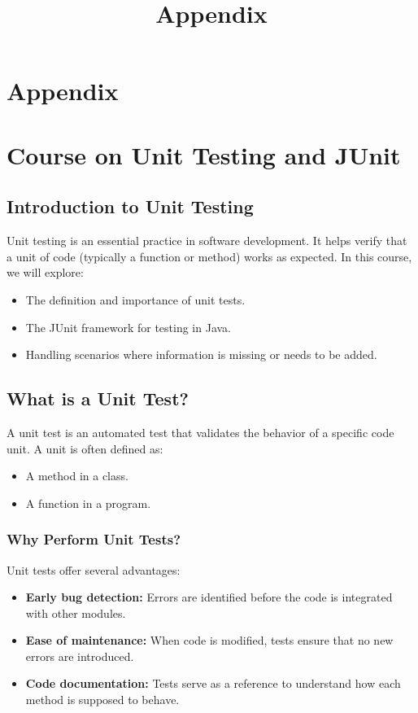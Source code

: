 \documentclass[12pt,a4paper]{article}
\title{Appendix}
\author{}
\date{}
\begin{document}
\maketitle

\tableofcontents

\newpage

\section*{Appendix}

\section{Course on Unit Testing and JUnit}
\subsection{Introduction to Unit Testing}
Unit testing is an essential practice in software development. It helps verify that a unit of code (typically a function or method) works as expected. In this course, we will explore:
\begin{itemize}
    \item The definition and importance of unit tests.
    \item The JUnit framework for testing in Java.
    \item Handling scenarios where information is missing or needs to be added.
\end{itemize}

\subsection{What is a Unit Test?}
A unit test is an automated test that validates the behavior of a specific code unit. A unit is often defined as:
\begin{itemize}
    \item A method in a class.
    \item A function in a program.
\end{itemize}

\subsubsection{Why Perform Unit Tests?}
Unit tests offer several advantages:
\begin{itemize}
    \item \textbf{Early bug detection:} Errors are identified before the code is integrated with other modules.
    \item \textbf{Ease of maintenance:} When code is modified, tests ensure that no new errors are introduced.
    \item \textbf{Code documentation:} Tests serve as a reference to understand how each method is supposed to behave.
\end{itemize}
\end{document}
